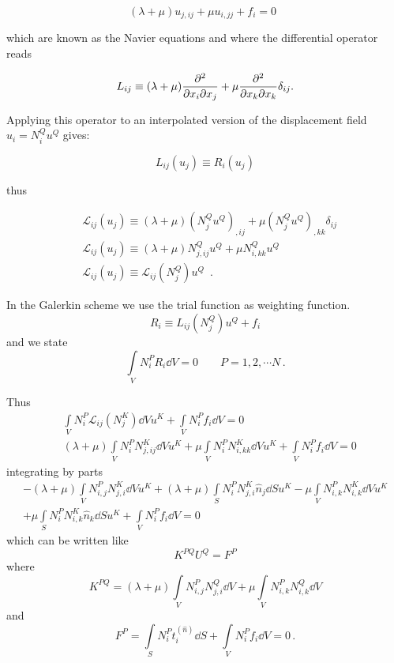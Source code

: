 \[(\lambda  + \mu ){u_{j,ij}} + \mu {u_{i,jj}} + {f_i} = 0 \enspace \]

which are known as the Navier equations and where the differential operator reads

\[L_{ij} \equiv (\lambda  + \mu )\pdv[2]{}{x_i}{x_j} + \mu \pdv[2]{}{x_k}{x_k}\delta_{ij}.\]

Applying this operator to an interpolated version of the displacement field $u_i = N_i^Q u^Q$ gives:

\[L_{ij}(u_j)\equiv R_i(u_j)\]

thus

\begin{align*}
&\mathcal{L}_{ij}(u_j) \equiv (\lambda  + \mu )(N_j^Q u^Q)_{,ij} + \mu (N_j^Q u^Q)_{,kk}\delta_{ij}\\
&\mathcal{L}_{ij}(u_j) \equiv (\lambda  + \mu )N_{j,ij}^Q u^Q + \mu N_{i,kk}^Q u^Q\\
&\mathcal{L}_{ij}(u_j) \equiv \mathcal{L}_{ij}(N_j^Q) u^Q \enspace .
\end{align*}

In the Galerkin scheme we use the trial function as weighting function.
\[R_i \equiv L_{ij}(N_j^Q) u^Q + f_i\]
and we state
\[\int\limits_V N_i^P R_i \dd{V} = 0 \qquad P=1,2,\cdots N\, .\]

Thus
\begin{align*}
&\int\limits_V N_i^P \mathcal{L}_{ij} (N_j^K)\dd{V} u^K  + \int\limits_V N_i^P f_i \dd{V} = 0 \\
&(\lambda  + \mu )\int\limits_V N_i^PN_{j,ij}^K \dd{V} u^K  + \mu \int\limits_V N_i^PN_{i,kk}^K \dd{V} u^K  + \int\limits_V N_i^P f_i \dd{V} = 0
\end{align*}
integrating by parts
\begin{align*}
- (\lambda  + \mu )\int\limits_V N_{i,j}^P N_{j,i}^K \dd{V} u^K + (\lambda  + \mu )\int\limits_S N_i^P N_{j,i}^K \hat{n}_j \dd{S} u^K - \mu \int\limits_V N_{i,k}^P N_{i,k}^K \dd{V} u^K \\
+ \mu \int\limits_S N_i^P N_{i,k}^K \hat{n}_k \dd{S} u^K  + \int\limits_V N_i^P f_i \dd{V} = 0
\end{align*}
which can be written like
\[K^{PQ} U^Q = F^P\]
where
\[K^{PQ} = (\lambda  + \mu )\int\limits_V N_{i,j}^P N_{j,i}^Q \dd{V}  + \mu \int\limits_V N_{i,k}^P N_{i,k}^Q\dd{V} \]
and
\[F^P = \int\limits_S N_i^P t_i^{(\hat n)} \dd{S} + \int\limits_V N_i^P f_i 
\dd{V} = 0 \, .\]



